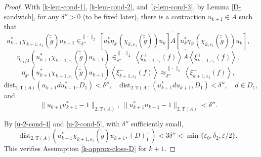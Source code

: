 \documentclass[12pt, oneside, psamsfonts]{amsart}
\theoremstyle{definition}
\theoremstyle{remark}
\numberwithin{equation}{section}
\newcommand{\norm}[1]{\| #1\|}
\newcommand{\eps}{\varepsilon}
\newcommand{\tr}{\mathrm{T}}
\begin{document}
\begin{proof}
With \eqref{k-lem-cond-1}, \eqref{k-lem-cond-2}, and \eqref{k-lem-cond-3}, by Lemma \ref{D-sandwich}, for any $\delta''>0$ (to be fixed later), there is a contraction $u_{k+1} \in A$ such that
\begin{equation}\label{k-u-2-cond-1}
 u_{k+1}^*\chi_{k+1, \eps_1}(\tilde{\tilde{g}})u_{k+1} \in^{\norm{\cdot}_{2}}_{\delta''}   \overline{[u_k^*\eta_{\delta'}(\chi_{k, \eps_1}(\tilde{\tilde{g}}))u_k] A [u_k^*\eta_{\delta'}(\chi_{k, \eps_1}(\tilde{\tilde{g}}))u_k] },
 \end{equation}
\begin{equation}\label{k-u-2-cond-2}
\eta_{\eps_1/4}(u^*_{k+1} \chi_{k+1, \eps_1}(\tilde{\tilde{g}}) u_{k+1}) \in^{\norm{\cdot}_2}_{\delta''} \overline{\left< \xi_{k+1, \eps_1}^+(f) \right> A \left< \xi_{k+1, \eps_1}^+(f) \right>},
\end{equation}
%
\begin{equation}\label{k-u-2-cond-3}
 \eta_{\delta''}(u_{k+1}^*\chi_{k+1, \eps_1}(\tilde{\tilde{g}})u_{k+1}) \left< \xi_{k+1, \eps_1}^-(f) \right>  \approx_{\delta''}^{\norm{\cdot}_2} \left< \xi_{k+1, \eps_1}^-(f) \right>,
 \end{equation}
%
\begin{equation}\label{u-2-cond-4}
\mathrm{dist}_{2, \tr(A)}(u_{k+1}du_{k+1}^*, D_1) < \delta'',\quad \mathrm{dist}_{2, \tr(A)}(u_{k+1}^*du_{k+1}, D_1) < \delta'',\quad d \in D_1,
\end{equation}
and
\begin{equation}\label{u-2-cond-5}
\norm{u_{k+1}u_{k+1}^* - 1}_{2, \tr(A)},\  \norm{u_{k+1}^*u_{k+1} - 1}_{2, \tr(A)} < \delta''.
\end{equation}
 
By \eqref{u-2-cond-4} and \eqref{u-2-cond-5}, with $\delta''$ sufficiently small,
\begin{equation}\label{k+1-approx-close-D}
\mathrm{dist}_{2, \tr(A)}(u_{k+1}^*\chi_{k+1, \eps_1}(\tilde{\tilde{g}}) u_{k+1}, (D)^+_1) < 3\delta'' < \min\{\eps_0, \delta_2, \eps/2\}.
\end{equation}
This verifies Assumption \eqref{k-approx-close-D} for $k+1$.


\end{proof}
\end{document}
